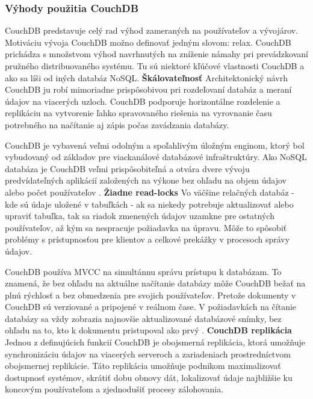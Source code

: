 \subsubsection{Výhody použitia CouchDB}
\indent CouchDB predstavuje celý rad výhod zameraných na používateľov a vývojárov. Motiváciu vývoja CouchDB možno definovať jedným slovom: relax. CouchDB prichádza s množstvom výhod navrhnutých na zníženie námahy pri prevádzkovaní pružného distribuovaného systému. Tu sú niektoré kľúčové vlastnosti CouchDB a ako sa líši od iných databáz NoSQL.\newline
\textbf{Škálovateľnosť} \newline
\indent Architektonický návrh CouchDB ju robí mimoriadne prispôsobivou pri rozdeľovaní databáz a meraní údajov na viacerých uzloch. CouchDB podporuje horizontálne rozdelenie a replikáciu na vytvorenie ľahko spravovaného riešenia na vyrovnanie času potrebného na načítanie aj zápis počas zavádzania databázy.

\indent CouchDB je vybavená veľmi odolným a spoľahlivým úložným enginom, ktorý bol vybudovaný od základov pre viackanálové databázové infraštruktúry. Ako NoSQL databáza je CouchDB veľmi prispôsobiteľná a otvára dvere vývoju predvídateľných aplikácií založených na výkone bez ohľadu na objem údajov alebo počet používateľov \cite{coucdb}.\newline
\textbf{Žiadne read-locks} \newline
\indent Vo väčšine relačných databáz - kde sú údaje uložené v tabuľkách - ak sa niekedy potrebuje aktualizovať alebo upraviť tabuľka, tak sa riadok zmenených údajov uzamkne pre ostatných používateľov, až kým sa nespracuje požiadavka na úpravu. Môže to spôsobiť problémy s prístupnosťou pre klientov a celkové prekážky v procesoch správy údajov.

\indent CouchDB používa MVCC na simultánnu správu prístupu k databázam. To znamená, že bez ohľadu na aktuálne načítanie databázy môže CouchDB bežať na plnú rýchlosť a bez obmedzenia pre svojich používateľov. Pretože dokumenty v CouchDB sú verziované a pripojené v reálnom čase. V požiadavkách na čítanie databázy sa vždy zobrazia najnovšie aktualizované databázové snímky, bez ohľadu na to, kto k dokumentu pristupoval ako prvý \cite{coucdb}.\newline
\textbf{CouchDB replikácia} \newline
\indent Jednou z definujúcich funkcií CouchDB je obojsmerná replikácia, ktorá umožňuje synchronizáciu údajov na viacerých serveroch a zariadeniach prostredníctvom obojsmernej replikácie. Táto replikácia umožňuje podnikom maximalizovať dostupnosť systémov, skrátiť dobu obnovy dát, lokalizovať údaje najbližšie ku koncovým používateľom a zjednodušiť procesy zálohovania.


